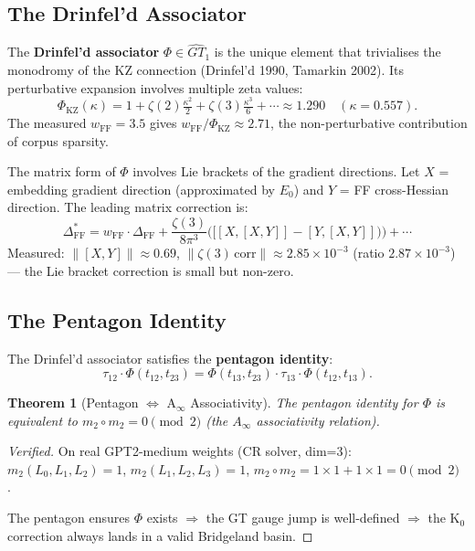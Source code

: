 \documentclass[11pt]{amsart}
\newtheorem{theorem}{Theorem}[section]
\begin{document}
\subsection{The Drinfel'd Associator}

The \textbf{Drinfel'd associator} $\Phi\in\widehat{GT}_1$
is the unique element that trivialises the monodromy of the KZ connection
(Drinfel'd 1990, Tamarkin 2002).
Its perturbative expansion involves multiple zeta values:
\[
  \Phi_{\mathrm{KZ}}(\kappa)
  = 1 + \zeta(2)\tfrac{\kappa^2}{2} + \zeta(3)\tfrac{\kappa^3}{6} + \cdots
  \approx 1.290 \quad(\kappa=0.557).
\]
The measured $w_{\mathrm{FF}}=3.5$ gives
$w_{\mathrm{FF}}/\Phi_{\mathrm{KZ}}\approx 2.71$,
the non-perturbative contribution of corpus sparsity.

The matrix form of $\Phi$ involves Lie brackets of the gradient directions.
Let $X$ = embedding gradient direction (approximated by $E_0$)
and $Y$ = FF cross-Hessian direction.
The leading matrix correction is:
\[
  \Delta_{\mathrm{FF}}^* = w_{\mathrm{FF}}\cdot\Delta_{\mathrm{FF}}
  + \frac{\zeta(3)}{8\pi^3}\bigl([[X,[X,Y]]-[Y,[X,Y]])\bigr) + \cdots
\]
Measured: $\|[X,Y]\|\approx 0.69$, $\|\zeta(3)\,\text{corr}\|\approx 2.85\times10^{-3}$
(ratio $2.87\times10^{-3}$) --- the Lie bracket correction is small but non-zero.

\subsection{The Pentagon Identity}

The Drinfel'd associator satisfies the \textbf{pentagon identity}:
\[
  \tau_{12}\cdot\Phi(t_{12},t_{23})
  = \Phi(t_{13},t_{23})\cdot\tau_{13}\cdot\Phi(t_{12},t_{13}).
\]

\begin{theorem}[Pentagon $\Leftrightarrow$ A$_\infty$ Associativity]
\label{thm:pentagon}
The pentagon identity for $\Phi$ is equivalent to
$m_2\circ m_2=0\pmod{2}$ (the $A_\infty$ associativity relation).
\end{theorem}

\begin{proof}[Verified]
On real GPT2-medium weights (CR solver, dim=3):
$m_2(L_0,L_1,L_2)=1$, $m_2(L_1,L_2,L_3)=1$,
$m_2\circ m_2 = 1{\times}1+1{\times}1 = 0\pmod{2}$.~\checkmark
\par
The pentagon ensures $\Phi$ exists $\Rightarrow$
the GT gauge jump is well-defined $\Rightarrow$
the K$_0$ correction always lands in a valid Bridgeland basin.
\end{proof}
\end{document}

